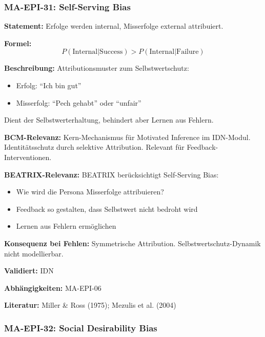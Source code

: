 \subsubsection*{MA-EPI-31: Self-Serving Bias}

\textbf{Statement:} Erfolge werden internal, Misserfolge external attribuiert.

\textbf{Formel:}
\begin{equation}
P(\text{Internal}|\text{Success}) > P(\text{Internal}|\text{Failure})
\end{equation}

\textbf{Beschreibung:}
Attributionsmuster zum Selbstwertschutz:
\begin{itemize}
    \item Erfolg: ``Ich bin gut''
    \item Misserfolg: ``Pech gehabt'' oder ``unfair''
\end{itemize}
Dient der Selbstwerterhaltung, behindert aber Lernen aus Fehlern.

\textbf{BCM-Relevanz:}
Kern-Mechanismus für Motivated Inference im IDN-Modul. Identitätsschutz durch selektive Attribution. Relevant für Feedback-Interventionen.

\textbf{BEATRIX-Relevanz:}
BEATRIX berücksichtigt Self-Serving Bias:
\begin{itemize}
    \item Wie wird die Persona Misserfolge attribuieren?
    \item Feedback so gestalten, dass Selbstwert nicht bedroht wird
    \item Lernen aus Fehlern ermöglichen
\end{itemize}

\textbf{Konsequenz bei Fehlen:}
Symmetrische Attribution. Selbstwertschutz-Dynamik nicht modellierbar.

\textbf{Validiert:} IDN

\textbf{Abhängigkeiten:} MA-EPI-06

\textbf{Literatur:} Miller \& Ross (1975); Mezulis et al. (2004)


\subsubsection*{MA-EPI-32: Social Desirability Bias}

